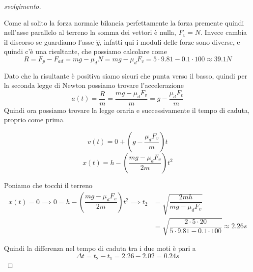 \documentclass{rapport}
\begin{document}
\begin{proof}[svolgimento]
\begin{figure}[h]
    \end{figure}

Come  al solito la forza normale bilancia perfettamente la forza premente quindi nell'asse parallelo al terreno la somma dei vettori è nulla, $F_v = N$. Invece cambia il discorso se guardiamo l'asse $\hat{y}$, infatti qui i moduli delle forze sono diverse, e quindi c'è una risultante, che possiamo calcolare come 
\[
R = F_p - F_{ad} = mg - \mu_d N  = mg - \mu_d F_v = 5 \cdot 9.81 - 0.1\cdot 100  \approx 39.1 N
\]

Dato che la risultante è positiva siamo sicuri che punta verso il basso, quindi per la seconda legge di Newton  possiamo trovare l'accelerazione 
\[
a(t) = \dfrac{R}{m} = \dfrac{mg - \mu_d F_v }{m}= g - \dfrac{\mu_d F_v }{m}
\]
Quindi ora possiamo trovare la legge oraria e successivamente il tempo di caduta, proprio come prima 

\[
v(t) = 0 + \left( g - \dfrac{\mu_d F_v }{m}\right)t
\]
\[
x(t) = h - \left(\dfrac{mg - \mu_d F_v }{2m}\right)t^2
\]

Poniamo che tocchi il terreno 
\begin{align*}
x(t)=  0 \implies 0 = h - \left(\dfrac{mg - \mu_d F_v }{2m}\right)t^2 \implies t_2 &= \sqrt{\dfrac{2mh}{mg-\mu_dF_v}} \\[0.6em]
&= \sqrt{\dfrac{2\cdot 5 \cdot 20}{5\cdot 9.81 - 0.1 \cdot 100}} \approx  2.26s
\end{align*}

Quindi la differenza nel tempo di caduta tra i due moti è pari a 
\[
\Delta t = t_2 - t_1 = 2.26 - 2.02 = 0.24s
\]

\end{proof}
\end{document}
